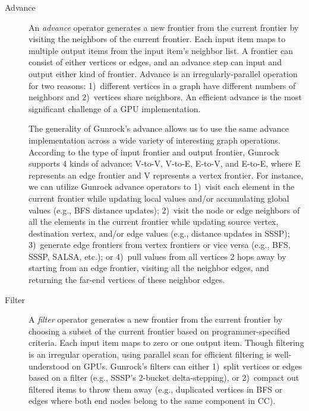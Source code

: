 \documentclass[format=acmsmall,review=false,screen=true]{acmart}
\begin{document}
\begin{description}
\item[Advance] An \emph{advance} operator generates a new frontier
  from the current frontier by visiting the neighbors of the current
  frontier. Each input item maps to multiple output items from the
  input item's neighbor list. A frontier can consist of either
  vertices or edges, and an advance step can input and output either
  kind of frontier. Advance is an irregularly-parallel operation for
  two reasons: 1)~different vertices in a graph have different numbers
  of neighbors and 2)~vertices share neighbors. An efficient advance
  is the most significant challenge of a GPU implementation.

  The generality of Gunrock's advance allows us to use the same
  advance implementation across a wide variety of interesting graph
  operations. According to the type of input frontier and output
  frontier, Gunrock supports 4 kinds of advance: V-to-V, V-to-E,
  E-to-V, and E-to-E, where E represents an edge frontier and V
  represents a vertex frontier. For instance, we can utilize Gunrock
  advance operators to 1)~visit each element in the current frontier
  while updating local values and/or accumulating global values (e.g.,
  BFS distance updates); 2)~visit the node or edge neighbors of all
  the elements in the current frontier while updating source vertex,
  destination vertex, and/or edge values (e.g., distance updates in
  SSSP); 3)~generate edge frontiers from vertex frontiers or vice
  versa (e.g., BFS, SSSP, SALSA, etc.); or 4)~pull values from all
  vertices 2 hops away by starting from an edge frontier, visiting all
  the neighbor edges, and returning the far-end vertices of these
  neighbor edges.

\item[Filter] A \emph{filter} operator generates a new frontier from
  the current frontier by choosing a subset of the current frontier
  based on programmer-specified criteria. Each input item maps to zero
  or one output item. Though filtering is an irregular operation,
  using parallel scan for efficient filtering is well-understood on
  GPUs. Gunrock's filters can either 1)~split vertices or edges based
  on a filter (e.g., SSSP's 2-bucket delta-stepping), or 2)~compact
  out filtered items to throw them away (e.g., duplicated vertices in
  BFS or edges where both end nodes belong to the same component in
  CC).


\end{description}
\end{document}
